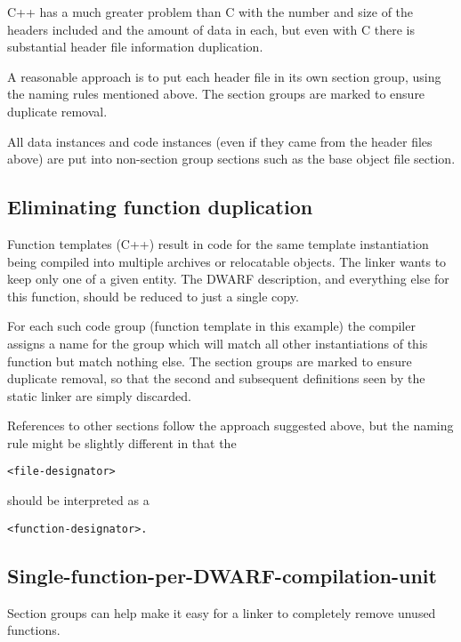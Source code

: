 C++ has a much greater problem than C with the number and
size of the headers included and the amount of data in each,
but even with C there is substantial header file information
duplication.

A reasonable approach is to put each header file in its own
section group, using the naming rules mentioned above. The
section groups are marked to ensure duplicate removal.

All data instances and code instances (even if they came
from the header files above) are put into non-section group
sections such as the base object file 
 section.

\subsection{Eliminating function duplication}
\label{app:eliminatingfunctionduplication}


Function templates (C++) result in code for the same template
instantiation being compiled into multiple archives or
relocatable objects. The linker wants to keep only one of a
given entity. The DWARF description, and everything else for
this function, should be reduced to just a single copy.

For each such code group (function template in this example)
the compiler assigns a name for the group which will match
all other instantiations of this function but match nothing
else. The section groups are marked to ensure duplicate
removal, so that the second and subsequent definitions seen
by the static linker are simply discarded.


References to other 
 sections follow the approach
suggested above, but the naming rule might be slightly
different in that the 
\begin{alltt}
<file-designator> 
\end{alltt}
should be interpreted
as a 
\begin{alltt}
<function-designator>.
\end{alltt}



\subsection{Single-function-per-DWARF-compilation-unit}
\label{app:singlefunctionperdwarfcompilationunit}

Section groups can help make it easy for a linker to completely
remove unused functions.

